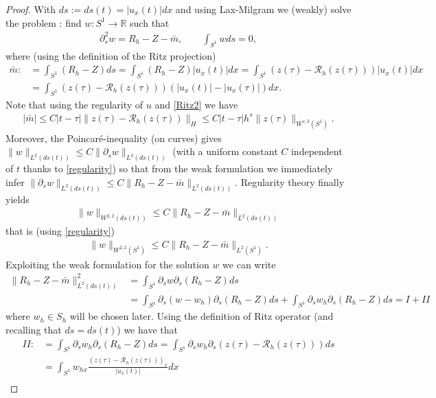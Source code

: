 \documentclass[a4paper,10pt]{article}
\newcommand{\R}{\mathbb{R}}
\numberwithin{equation}{section}
\begin{document}
\begin{proof}
With $ds:=ds(t)=|u_{x}(t)|dx$ and using Lax-Milgram we (weakly) solve the problem : find $w:S^{1} \to \R$ such that
\begin{align*}
\partial^{2}_{s} w = R_{h}-Z -\bar{m}, \qquad \int_{S^{1}}w ds=0,
\end{align*}
where (using the definition of the Ritz projection)
\begin{align*} \bar{m}:&=\int_{S^{1}}(R_{h}-Z) ds=\int_{S^{1}}(R_{h}-Z) |u_{x}(t)|dx= \int_{S^{1}} (z(\tau) -\mathcal{R}_{h}(z(\tau)))|u_{x}(t)|dx\\
&= \int_{S^{1}} (z(\tau) -\mathcal{R}_{h}(z(\tau)))(|u_{x}(t)|- |u_{x}(\tau)|)dx .
\end{align*}
Note that using the regularity of $u$ and \eqref{Ritz2} we have
\begin{align}\label{mbarest}
|\bar{m}| \leq C |t-\tau|\|z(\tau) -\mathcal{R}_{h}(z(\tau))\|_{H} \leq C |t-\tau| h^{s}\|z(\tau)\|_{W^{s,2}(S^{1})}.
\end{align}
Moreover, the Poincar\'{e}-inequality (on curves) gives $\| w\|_{L^{2}(ds(t))} \leq C\|\partial_{s} w\|_{L^{2}(ds(t))}$ (with a uniform constant $C$ independent of $t$ thanks to \eqref{regularity})
so that from the weak formulation we immediately infer
$\|\partial_{s} w\|_{L^{2}(ds(t))} \leq C \| R_{h}-Z -\bar{m} \|_{L^{2}(ds(t))} $.
Regularity theory finally yields
\begin{align*}
\| w \|_{W^{2,2}(ds(t))} \leq C \| R_{h}-Z -\bar{m} \|_{L^{2}(ds(t))}
\end{align*}
that is (using \eqref{regularity})
\begin{align}\label{reg-ww}
\| w \|_{W^{2,2}(S^{1})} \leq C \| R_{h}-Z -\bar{m} \|_{L^{2}(S^{1})}.
\end{align}
Exploiting the weak formulation for the solution $w$ we can write
\begin{align*}
\| R_{h}-Z -\bar{m}\|_{L^{2}(ds(t))}^{2} &=\int_{S^{1}} \partial_{s} w \partial_{s} (R_{h}-Z) ds
\\
&=\int_{S^{1}} \partial_{s} (w -w_{h})\partial_{s} (R_{h}-Z) ds + \int_{S^{1}} \partial_{s} w_{h}\partial_{s} (R_{h}-Z) ds=I+II
\end{align*}
where $w_{h} \in S_{h}$ will be chosen later. Using the definition of Ritz operator (and recalling that $ds=ds(t)$) we have that
\begin{align*}
II:&=\int_{S^{1}} \partial_{s} w_{h}\partial_{s} (R_{h}-Z) ds=\int_{S^{1}} \partial_{s} w_{h}\partial_{s} (z(\tau)-\mathcal{R}_{h}(z(\tau))) ds\\
&=\int_{S^{1}} w_{hx}\frac{(z(\tau)-\mathcal{R}_{h}(z(\tau)))_{x}}{|u_{x}(t)|} dx \\

\end{align*}
\end{proof}
\end{document}
